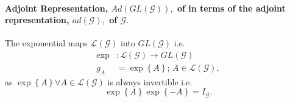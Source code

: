 \documentclass[aps,preprint]{revtex4}%
\begin{document}
\paragraph{Adjoint Representation, $Ad\left(  GL\left(  \mathcal{G}\right)
\right)  ,$ of in terms of the adjoint representation, $ad\left(
\mathcal{G}\right)  ,$ of $\mathcal{G}.$}

The exponential maps $\mathcal{L}\left(  \mathcal{G}\right)  $ into $GL\left(
\mathcal{G}\right)  $ i.e.
\begin{align}
\exp &  :\mathcal{L}\left(  \mathcal{G}\right)  \rightarrow GL\left(
\mathcal{G}\right) \\
g_{A}  &  =\exp\left\{  A\right\}  ;\,A\in\mathcal{L}\left(  \mathcal{G}%
\right)  ,
\end{align}
as $\exp\left\{  A\right\}  \forall A\in\mathcal{L}\left(  \mathcal{G}\right)
$ is always invertible i.e.
\begin{equation}
\exp\left\{  A\right\}  \exp\left\{  -A\right\}  =I_{\mathcal{G}}.
\end{equation}
\end{document}
